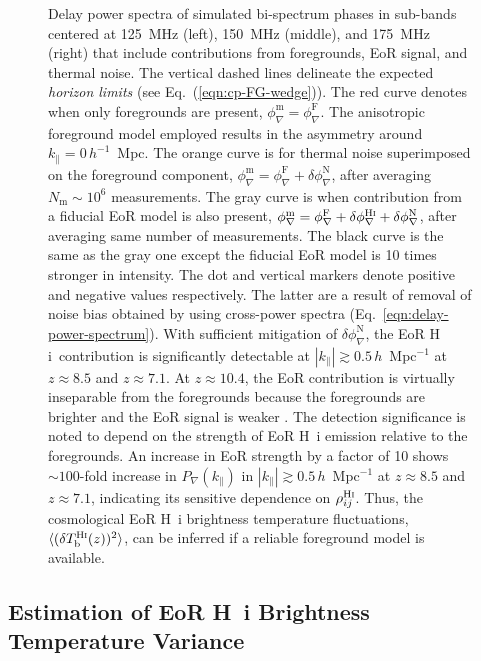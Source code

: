 \documentclass[
reprint,
superscriptaddress,
amsmath,
amssymb,
aps,
prd
]{revtex4-1}
\newcommand{\HI}{H\,{\sc i}}
\begin{document}
\begin{figure}[htb]
\caption{Delay power spectra of simulated bi-spectrum phases in sub-bands centered at 125~MHz (left), 150~MHz (middle), and 175~MHz (right) that include contributions from foregrounds, EoR signal, and thermal noise. The vertical dashed lines delineate the expected {\it horizon limits} (see Eq.~(\ref{eqn:cp-FG-wedge})). The red curve denotes when only foregrounds are present, $\phi_\nabla^\textrm{m}=\phi_\nabla^\textrm{F}$. The anisotropic foreground model employed \cite{thy15a} results in the asymmetry around $k_\parallel=0\,h^{-1}$~Mpc. The orange curve is for thermal noise superimposed on the foreground component, $\phi_\nabla^\textrm{m}=\phi_\nabla^\textrm{F}+\delta\phi_\nabla^\textrm{N}$, after averaging $N_\textrm{m} \sim 10^6$ measurements. The gray curve is when contribution from a fiducial EoR model is also present, $\phi_\nabla^\textrm{m}=\phi_\nabla^\textrm{F}+\delta\phi_\nabla^\textrm{H{\sc i}}+\delta\phi_\nabla^\textrm{N}$, after averaging same number of measurements. The black curve is the same as the gray one except the fiducial EoR model is 10 times stronger in intensity. The dot and vertical markers denote positive and negative values respectively. The latter are a result of removal of noise bias obtained by using cross-power spectra (Eq.~\ref{eqn:delay-power-spectrum}). With sufficient mitigation of $\delta\phi_\nabla^\textrm{N}$, the EoR \HI\ contribution is significantly detectable at $|k_\parallel| \gtrsim 0.5\,h$~Mpc$^{-1}$ at $z\approx 8.5$ and $z\approx 7.1$. At $z\approx 10.4$, the EoR contribution is virtually inseparable from the foregrounds because the foregrounds are brighter and the EoR signal is weaker \cite[][see power spectrum amplitude of {\sc faint galaxies} model at $k=0.5$~Mpc$^{-1}$ in their Fig.~2]{gre17b}. The detection significance is noted to depend on the strength of EoR H~{\sc i} emission relative to the foregrounds. An increase in EoR strength by a factor of 10 shows $\sim 100$-fold increase in $P_\nabla(k_\parallel)$ in $|k_\parallel| \gtrsim 0.5\,h$~Mpc$^{-1}$ at $z\approx 8.5$ and $z\approx 7.1$, indicating its sensitive dependence on $\rho_{ij}^\textrm{H{\sc i}}$. Thus, the cosmological EoR H~{\sc i} brightness temperature fluctuations, $\langle(\delta T_\textrm{b}^\textrm{H{\sc i}}(z))^2\rangle$, can be inferred if a reliable foreground model is available. \label{fig:cpdps}}
\end{figure}

\subsection{Estimation of EoR H~{\sc i} Brightness Temperature Variance}\label{sec:spin-temp}
\end{document}
